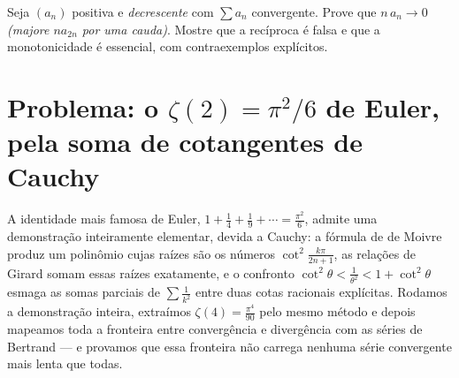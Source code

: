 \begin{exercise}[$\star\star\star$]\label{exo:b2:series:12}
Seja $(a_n)$ positiva e \emph{decrescente} com $\sum a_n$
convergente. Prove que $n\,a_n \to 0$ \emph{(majore $n a_{2n}$ por uma
cauda)}. Mostre que a recíproca é falsa e que a monotonicidade é
essencial, com contraexemplos explícitos.
\end{exercise}

\section{Problema: o $\zeta(2) = \pi^2/6$ de Euler, pela soma de
cotangentes de Cauchy}

A identidade mais famosa de Euler, $1 + \frac14 + \frac19 + \cdots =
\frac{\pi^2}6$, admite uma demonstração inteiramente elementar, devida a
Cauchy: a fórmula de de Moivre produz um polinômio cujas raízes são
os números $\cot^2\frac{k\pi}{2n+1}$, as relações de Girard somam essas raízes
exatamente, e o confronto $\cot^2\theta < \frac{1}{\theta^2} <
1 + \cot^2\theta$ esmaga as somas parciais de $\sum\frac1{k^2}$
entre duas cotas racionais explícitas. Rodamos a demonstração inteira,
extraímos $\zeta(4) = \frac{\pi^4}{90}$ pelo mesmo método e depois
mapeamos toda a fronteira entre convergência e divergência com
as séries de Bertrand --- e provamos que essa fronteira não carrega
nenhuma série convergente mais lenta que todas.

